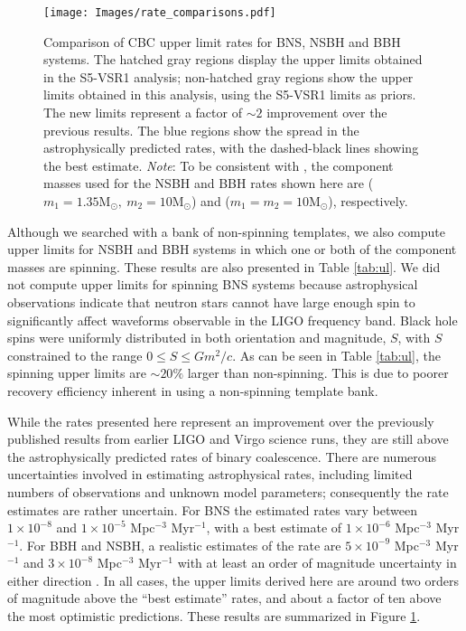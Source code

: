 \documentclass[prd,superscriptaddress,showpacs,amssymb,amsmath,amsfonts,aps,altaffilletter,nofootinbib,letterpaper,twocolumn]{revtex4}
\def\Msun{\ensuremath{\mathrm{M_{\odot}}}}
\begin{document}
\begin{figure}[ht]
\texttt{[image: Images/rate\_comparisons.pdf]}
\caption{Comparison of CBC upper limit rates for \ac{BNS}, \ac{NSBH} and \ac{BBH}
systems.  The hatched gray regions display the upper limits obtained in the
S5-VSR1 analysis; non-hatched gray regions show the upper limits obtained in
this analysis, using the S5-VSR1 limits as priors.  The new limits represent a
factor of $\sim 2$ improvement over the previous results.  The blue
regions show the spread in the astrophysically predicted rates, with the
dashed-black lines showing the best estimate.  \cite{ratesdoc} {\it Note}: To
be consistent with \cite{ratesdoc}, the component masses used for the \ac{NSBH}
and \ac{BBH} rates shown here are ($m_1 = 1.35\Msun,~m_2 = 10\Msun$) and ($m_1
= m_2 = 10\Msun$), respectively.}
\label{fig:rate_comp} 
\end{figure}


Although we searched with a bank of non-spinning templates, we also compute
upper limits for \ac{NSBH} and \ac{BBH} systems in which one or both of the
component masses are spinning. These results are also presented in Table
\ref{tab:ul}. We did not compute upper limits for spinning \ac{BNS} systems
because astrophysical observations indicate that neutron stars cannot have
large enough spin to significantly affect waveforms observable in the \ac{LIGO}
frequency band. \cite{ATNF:psrcat,Apostolatos:1994} Black hole spins were
uniformly distributed in both orientation and magnitude, $S$, with $S$
constrained to the range $0 \leq S \leq Gm^2/c$. As can be seen in Table
\ref{tab:ul}, the spinning upper limits are $\sim20\%$ larger than
non-spinning. This is due to poorer recovery efficiency inherent in using a
non-spinning template bank.

While the rates presented here represent an improvement over the
previously published results from earlier \ac{LIGO} and Virgo science
runs, they are still above the astrophysically predicted rates
of binary coalescence.  There are numerous uncertainties involved in
estimating astrophysical rates, including limited numbers of
observations and unknown model parameters; consequently the rate
estimates are rather uncertain.  For \ac{BNS} the estimated rates vary
between $1 \times 10^{-8}$ and $1 \times 10^{-5}$ Mpc$^{-3}$ Myr$^{-1}$,
with a best estimate of $1 \times 10^{-6}$ Mpc$^{-3}$ Myr$^{-1}$.  For
\ac{BBH} and \ac{NSBH}, a realistic estimates of the rate are
$5 \times 10^{-9}$ Mpc$^{-3}$ Myr$^{-1}$ and 
$3 \times 10^{-8}$ Mpc$^{-3}$ Myr$^{-1}$ with at least an order of
magnitude uncertainty in either direction \cite{ratesdoc}.  In all cases, the upper
limits derived here are around two orders of magnitude above the ``best
estimate'' rates, and about a factor of ten above the most optimistic
predictions.  These results are summarized in Figure
\ref{fig:rate_comp}.
\end{document}

